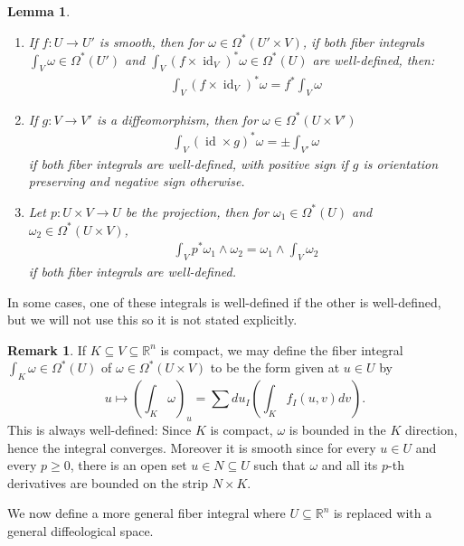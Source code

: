 \documentclass{scrartcl}
\theoremstyle{plain}
\newtheorem{lemma}[theorem]{Lemma}
\theoremstyle{definition}
\newtheorem{remark}[theorem]{Remark}
\newcommand{\R}{\mathbb R}
\renewcommand{\subset}{\subseteq}
\DeclareMathOperator{\id}{id}
\begin{document}
\begin{lemma}\label{lem:fiber-int-euclidean}
    \begin{enumerate}
        \item 
    If $f\colon U\to U'$ is smooth, then for $\omega\in \Omega^*(U'\times V)$, if both fiber integrals $\int_V\omega\in\Omega^*(U')$ and $\int_V (f\times\id_V)^*\omega\in\Omega^*(U)$ are well-defined, then:
    \begin{align*}
        \int_{V} (f\times \id_V)^*\omega = f^*\int_{V}\omega
    \end{align*}
    \item 
    If $g\colon  V\to V'$ is a diffeomorphism, then for $\omega\in \Omega^*(U\times V')$
    \begin{align*}
        \int_V (\id\times g)^*\omega = \pm \int_{V'} \omega
    \end{align*}
    if both fiber integrals are well-defined, with positive sign if $g$ is orientation preserving and negative sign otherwise.
    \item Let $p\colon U\times V\to U$ be the projection, then for $\omega_1\in\Omega^*(U)$ and $\omega_2\in\Omega^*(U\times V)$, 
    \begin{align*}
        \int_V p^*\omega_1 \wedge\omega_2 = \omega_1\wedge\int_V \omega_2
    \end{align*}
    if both fiber integrals are well-defined. 
\end{enumerate}
\end{lemma}
In some cases, one of these integrals is well-defined if the other is well-defined, but we will not use this so it is not stated explicitly.


\begin{remark}\label{rmk:fiber-int-cpt}
    If $K\subset V\subset \R^n$ is compact, we may define the fiber integral $\int_K\omega\in \Omega^*(U)$ of $\omega\in\Omega^*(U\times V)$ to be the form given at $u\in U$ by
    $$u\mapsto \left(\int_K \omega\right)_u = \sum du_I \left(\int_K f_{I}(u, v) dv\right).$$
    This is always well-defined: Since $K$ is compact, $\omega$ is bounded in the $K$ direction, hence the integral converges. Moreover it is smooth since for every $u\in U$ and every $p\geq 0$, there is an open set $u\in N\subset U$ such that $\omega$ and all its $p$-th derivatives are bounded on the strip $N\times K$. 
\end{remark}

We now define a more general fiber integral where $U\subset \R^n$ is replaced with a general diffeological space.
\end{document}
